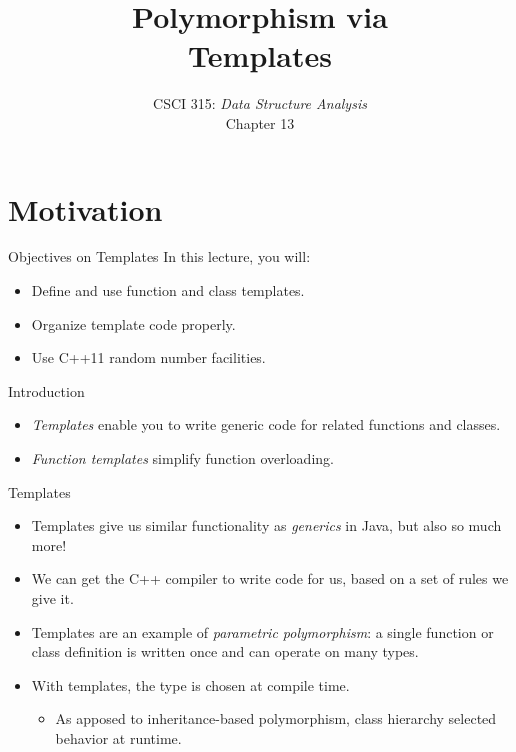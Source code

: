 \documentclass[14pt,aspectratio=1610, hyperref={pdfpagelayout=SinglePage}]{beamer}
\title{\Huge{}Polymorphism via\\\Huge{}Templates}
\subtitle{CSCI 315: \textit{Data Structure Analysis}\\Chapter 13}
\institute{Charleston Southern University}
\begin{document}
\begin{frame}
  \titlepage%
\end{frame}

\section{Motivation}

\begin{frame}{Objectives on Templates}
In this lecture, you will:
\begin{itemize}
\item
  Define and use function and class templates.
\item
  Organize template code properly.
\item
  Use C++11 random number facilities.
\end{itemize}
\end{frame}

\begin{frame}{Introduction}
  \begin{itemize}
  \item
    \emph{Templates} enable you to write generic code for related
    functions and classes.
  \item
    \emph{Function templates} simplify function overloading.
  \end{itemize}
\end{frame}

\begin{frame}{Templates}

\begin{itemize}
\item
  Templates give us similar functionality as \emph{generics} in Java, but
  also so much more!
\item
  We can get the C++ compiler to write code for us, based on a set of rules we
  give it.
\item
  Templates are an example of
  \emph{parametric polymorphism}: a single function or class definition is
  written once and can operate on many types.
\item
  With templates, the type is chosen at compile time.
\begin{itemize}
\item
  As apposed to inheritance-based polymorphism, class
  hierarchy selected behavior at runtime. 
\end{itemize}
\end{itemize}
\end{frame}
\end{document}

